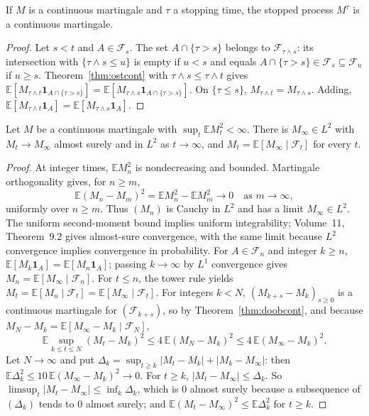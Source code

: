 \begin{corollary}\label{cor:stopped}
If $M$ is a continuous martingale and $\tau$ a stopping time, the stopped process $M^\tau$ is a continuous martingale.
\end{corollary}

\begin{proof}
Let $s<t$ and $A\in\mathcal F_s$. The set $A\cap\{\tau>s\}$ belongs to $\mathcal F_{\tau\wedge s}$: its intersection with $\{\tau\wedge s\le u\}$ is empty if $u<s$ and equals $A\cap\{\tau>s\}\in\mathcal F_s\subseteq\mathcal F_u$ if
$u\ge s$. Theorem~\ref{thm:ostcont} with $\tau\wedge s\le\tau\wedge t$ gives $\mathbb E[M_{\tau\wedge t}\mathbf 1_{A\cap\{\tau>s\}}]=\mathbb E[M_{\tau\wedge s}\mathbf 1_{A\cap\{\tau>s\}}]$. On $\{\tau\le s\}$, $M_{\tau\wedge t}=M_{\tau\wedge s}$.
Adding, $\mathbb E[M_{\tau\wedge t}\mathbf 1_A]=\mathbb E[M_{\tau\wedge s}\mathbf 1_A]$.
\end{proof}

\begin{theorem}[convergence in $L^2$]\label{thm:L2cont}
Let $M$ be a continuous martingale with $\sup_t\mathbb EM_t^2<\infty$. There is $M_\infty\in L^2$ with $M_t\to M_\infty$ almost surely and in $L^2$ as $t\to\infty$, and $M_t=\mathbb E[M_\infty\mid\mathcal F_t]$ for every $t$.
\end{theorem}

\begin{proof}
At integer times, $\mathbb EM_n^2$ is nondecreasing and bounded. Martingale orthogonality gives, for $n\ge m$,
\[
\mathbb E(M_n-M_m)^2=\mathbb EM_n^2-\mathbb EM_m^2\longrightarrow0
\quad\text{as }m\to\infty,
\]
uniformly over $n\ge m$. Thus $(M_n)$ is Cauchy in $L^2$ and has a limit $M_\infty\in L^2$. The uniform second-moment bound implies uniform integrability; Volume~11, Theorem~9.2 gives almost-sure convergence, with the same limit because $L^2$ convergence implies convergence in probability. For $A\in\mathcal F_n$ and integer $k\ge n$, $\mathbb E[M_k\mathbf1_A]=\mathbb E[M_n\mathbf1_A]$; passing $k\to\infty$ by $L^1$ convergence gives $M_n=\mathbb E[M_\infty\mid\mathcal F_n]$. For $t\le n$, the tower rule yields $M_t=\mathbb E[M_n\mid\mathcal F_t]=\mathbb E[M_\infty\mid\mathcal F_t]$.
For integers $k<N$, $(M_{k+s}-M_k)_{s\ge0}$ is a continuous martingale for $(\mathcal F_{k+s})$, so by Theorem~\ref{thm:doobcont}, and because $M_N-M_k=\mathbb E[M_\infty-M_k\mid\mathcal F_N]$,
\[
\mathbb E\sup_{k\le t\le N}(M_t-M_k)^2\le4\,\mathbb E(M_N-M_k)^2\le4\,\mathbb E(M_\infty-M_k)^2.
\]
Let $N\to\infty$ and put $\Delta_k=\sup_{t\ge k}|M_t-M_k|+|M_k-M_\infty|$: then $\mathbb E\Delta_k^2\le10\,\mathbb E(M_\infty-M_k)^2\to0$. For $t\ge k$, $|M_t-M_\infty|\le\Delta_k$. So $\limsup_t|M_t-M_\infty|\le\inf_k\Delta_k$,
which is $0$ almost surely because a subsequence of $(\Delta_k)$ tends to $0$ almost surely; and $\mathbb E(M_t-M_\infty)^2\le\mathbb E\Delta_k^2$ for $t\ge k$.
\end{proof}

